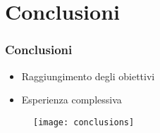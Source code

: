 
\section{Conclusioni}
\begin{frame}

  \frametitle{Conclusioni}

  \begin{itemize}
  \item Raggiungimento degli obiettivi
  \item Esperienza complessiva
  \end{itemize}

  \begin{figure}[H]
    \centering
    \texttt{[image: conclusions]}
  \end{figure}
  
\end{frame}
